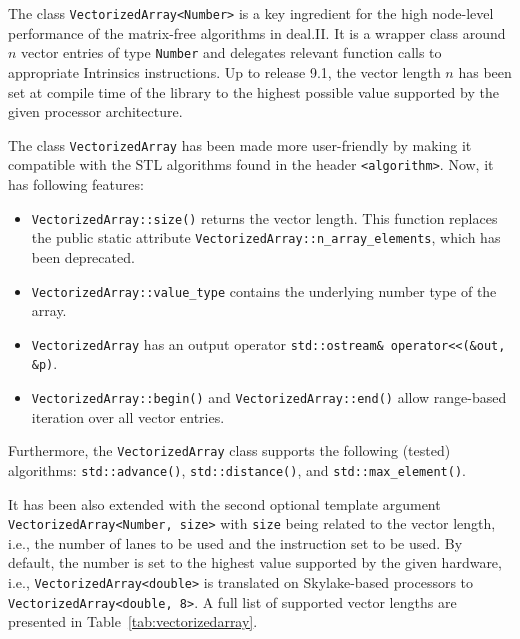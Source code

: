 \documentclass{ansarticle-preprint}
\begin{document}
The class \texttt{VectorizedArray<Number>} is a key ingredient for the high 
node-level performance of the matrix-free algorithms in deal.II. It is a wrapper 
class around $n$ vector entries of type \texttt{Number} and delegates relevant 
function calls to appropriate Intrinsics instructions. Up to release 9.1, the 
vector length $n$ has been set at compile time of the library to the highest 
possible value supported by the given processor architecture.

The class \texttt{VectorizedArray} has been made more user-friendly by making 
it compatible with the STL algorithms found in the header \texttt{<algorithm>}. 
Now, it has following features:
\begin{itemize}
\item \texttt{VectorizedArray::size()} returns the vector length. This function 
replaces the public static attribute \texttt{VectorizedArray::n\_array\_elements}, 
which has been deprecated.
\item \texttt{VectorizedArray::value\_type} contains the underlying number type of 
the array.
\item \texttt{VectorizedArray} has an output operator 
\texttt{std::ostream\& operator<<(\&out, \&p)}.
\item \texttt{VectorizedArray::begin()} and \texttt{VectorizedArray::end()} allow 
range-based iteration over all vector entries.
\end{itemize}
Furthermore, the \texttt{VectorizedArray} class supports the following (tested) 
algorithms: \texttt{std::\allowbreak ad\-vance()}, \texttt{std::distance()}, and \texttt{std::max\_element()}.

It has been also extended with the second optional template argument 
\texttt{VectorizedArray<Number, size>} with \texttt{size} being related to the 
vector length, i.e., the number of lanes to be used and the instruction set to be 
used. By default, the number is set to the highest value supported by the given 
hardware, i.e., \texttt{VectorizedArray<double>} is translated on Skylake-based 
processors to \texttt{VectorizedArray<double, 8>}. A full list of supported 
vector lengths are presented in Table~\ref{tab:vectorizedarray}.
\end{document}
